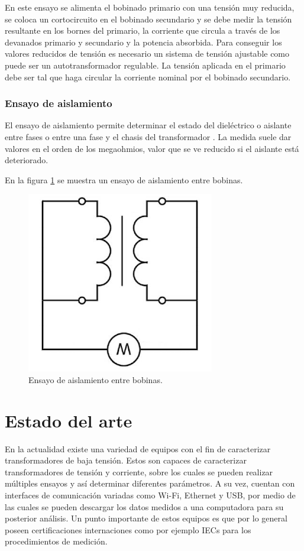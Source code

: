 En este ensayo se alimenta el bobinado primario con una tensión muy reducida, se coloca un cortocircuito en el bobinado secundario y se debe medir la tensión resultante en los bornes del primario, la corriente que circula a través de los devanados primario y secundario y la potencia absorbida. Para conseguir los valores reducidos de tensión es necesario un sistema de tensión ajustable como puede ser un autotransformador regulable. La tensión aplicada en el primario debe ser tal que haga circular la corriente nominal por el bobinado secundario.

\subsubsection{Ensayo de aislamiento}

El ensayo de aislamiento permite determinar el estado del dieléctrico o aislante entre fases o entre una fase y el chasis del transformador \citep{TRAFO_AISL}. La medida suele dar valores en el orden de los megaohmios, valor que se ve reducido si el aislante está deteriorado.

En la figura \ref{fig:figEnsayoAislacion} se muestra un ensayo de aislamiento entre bobinas.

\begin{figure}[htpb]
	\centering
	\includegraphics[scale=.5]{./Figures/EnsayoAislacion.png}
	\caption{Ensayo de aislamiento entre bobinas.}
	\label{fig:figEnsayoAislacion}
\end{figure}



\section{Estado del arte}
En la actualidad existe una variedad de equipos con el fin de caracterizar transformadores de baja tensión. Estos son capaces de caracterizar transformadores de tensión y corriente, sobre los cuales se pueden realizar múltiples ensayos y así determinar diferentes parámetros. A su vez, cuentan con interfaces de comunicación variadas como Wi-Fi, Ethernet y USB, por medio de las cuales se pueden descargar los datos medidos a una computadora para su posterior análisis. Un punto importante de estos equipos es que por lo general poseen certificaciones internaciones como por ejemplo IECs para los procedimientos de medición.

